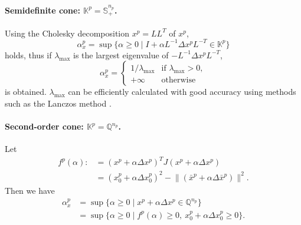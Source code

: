 \paragraph{Semidefinite cone: $\mathbb{K}^p = \mathbb{S}^{n_p}_+$.}
Using the Cholesky decomposition $x^p=LL^T$ of $x^p$,
\[\alpha^p_x = \sup\{\alpha \geq 0 \mid I + \alpha L^{-1} \Delta x^p L^{-T} \in \mathbb{K}^p\}\]
holds, thus if $\lambda_{\max}$ is the largest eigenvalue of $-L^{-1} \Delta x^p L^{-T}$,
\[\alpha^p_x = \begin{cases}
    1/\lambda_{\max} & \text{if } \lambda_{\max} > 0, \\
    +\infty & \text{otherwise}
\end{cases}\]
is obtained.
$\lambda_{\max}$ can be efficiently calculated with good accuracy using methods such as the Lanczos method \cite{Golub2013}.

\paragraph{Second-order cone: $\mathbb{K}^p = \mathbb{Q}^{n_p}$.}
Let
\begin{align*}
  f^p(\alpha)
  :&= ( x^p + \alpha \Delta x^p )^T J ( x^p + \alpha \Delta x^p )\\
   &=  ( x^p_0 + \alpha \Delta x^p_0 )^2 - \bigl\|( \bar{x}^p + \alpha \Delta \bar{x}^p )\bigr\|^2.
\end{align*}
Then we have
\begin{align*}
    \alpha_x^p 
    &= \sup\{\alpha \geq 0 \mid x^p + \alpha \Delta x^p \in \mathbb{Q}^{n_p}\}\\
    &= \sup\{\alpha \geq 0 \mid f^p(\alpha) \geq 0, ~x^p_0 + \alpha \Delta x^p_0 \geq 0\}.
\end{align*}

